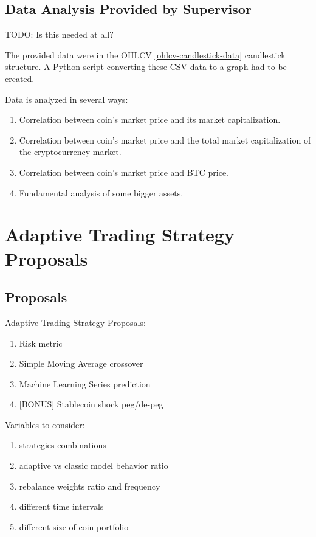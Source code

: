 \section{Data Analysis Provided by Supervisor}

TODO: Is this needed at all?

The provided data were in the OHLCV \ref{ohlcv-candlestick-data} candlestick structure. A Python script converting these CSV data to a graph had to be created.

Data is analyzed in several ways:
\begin{enumerate}
    \item Correlation between coin's market price and its market capitalization.
    \item Correlation between coin's market price and the total market capitalization of the cryptocurrency market.
    \item Correlation between coin's market price and BTC price.
    \item Fundamental analysis of some bigger assets.
\end{enumerate}

\chapter{Adaptive Trading Strategy Proposals}
\label{chapter-strategy-proposals}


\section{Proposals}

Adaptive Trading Strategy Proposals:
\begin{enumerate}
    \item Risk metric
    \item Simple Moving Average crossover
    \item Machine Learning Series prediction
    \item {[BONUS]} Stablecoin shock peg/de-peg
\end{enumerate}

Variables to consider:
\begin{enumerate}
    \item strategies combinations
    \item adaptive vs classic model behavior ratio
    \item rebalance weights ratio and frequency
    \item different time intervals
    \item different size of coin portfolio
\end{enumerate}

